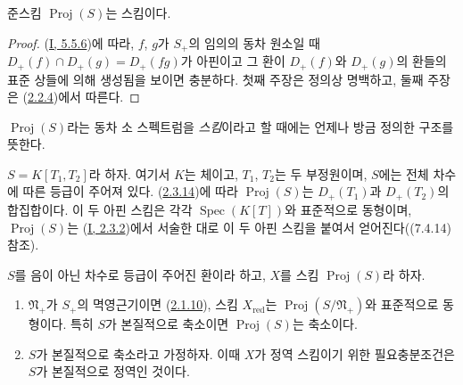 \begin{proposition}[2.4.2]
\label{II.2.4.2-ko}
준스킴 $\operatorname{Proj}(S)$는 스킴이다.
\end{proposition}

\begin{proof}
(\hyperref[I.5.5.6-ko]{I, 5.5.6})에 따라, $f$, $g$가 $S_+$의 임의의
동차 원소일 때 $D_+(f)\cap D_+(g)=D_+(fg)$가 아핀이고 그 환이
$D_+(f)$와 $D_+(g)$의 환들의 표준 상들에 의해 생성됨을 보이면
충분하다. 첫째 주장은 정의상 명백하고, 둘째 주장은
(\hyperref[II.2.2.4-ko]{2.2.4})에서 따른다.
\end{proof}
$\operatorname{Proj}(S)$라는 동차 소 스펙트럼을 \emph{스킴}이라고 할
때에는 언제나 방금 정의한 구조를 뜻한다.

\begin{example}[2.4.3]
\label{II.2.4.3-ko}
$S=K[T_1,T_2]$라 하자. 여기서 $K$는 체이고, $T_1$, $T_2$는 두
부정원이며, $S$에는 전체 차수에 따른 등급이 주어져 있다.
(\hyperref[II.2.3.14-ko]{2.3.14})에 따라
$\operatorname{Proj}(S)$는 $D_+(T_1)$과 $D_+(T_2)$의 합집합이다.
이 두 아핀 스킴은 각각 $\operatorname{Spec}(K[T])$와 표준적으로
동형이며, $\operatorname{Proj}(S)$는
(\hyperref[I.2.3.2-ko]{I, 2.3.2})에서 서술한 대로 이 두 아핀 스킴을
붙여서 얻어진다((7.4.14) 참조).
\end{example}

\begin{proposition}[2.4.4]
\label{II.2.4.4-ko}
$S$를 음이 아닌 차수로 등급이 주어진 환이라 하고, $X$를 스킴
$\operatorname{Proj}(S)$라 하자.
\begin{enumerate}
  \item[\rm(i)] $\mathfrak{N}_+$가 $S_+$의 멱영근기이면
    (\hyperref[II.2.1.10-ko]{2.1.10}), 스킴 $X_{\mathrm{red}}$는
    $\operatorname{Proj}(S/\mathfrak{N}_+)$와 표준적으로 동형이다. 특히
    $S$가 본질적으로 축소이면 $\operatorname{Proj}(S)$는 축소이다.
  \item[\rm(ii)] $S$가 본질적으로 축소라고 가정하자. 이때 $X$가 정역
    스킴이기 위한 필요충분조건은 $S$가 본질적으로 정역인 것이다.
\end{enumerate}
\end{proposition}

